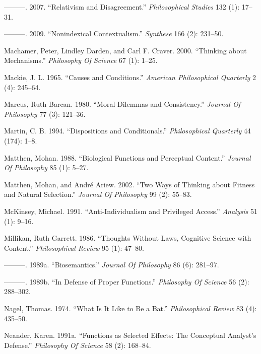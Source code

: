 \documentclass[
  10pt,
  letterpaper,
  DIV=11,
  numbers=noendperiod,
  twoside]{scrartcl}
\newlength{\cslhangindent}
\newenvironment{CSLReferences}[2] %
 {\begin{list}{}{%
  \setlength{\itemindent}{0pt}
  \setlength{\leftmargin}{0pt}
  \setlength{\parsep}{0pt}
  \ifodd #1
   \setlength{\leftmargin}{\cslhangindent}
   \setlength{\itemindent}{-1\cslhangindent}
  \fi
  \setlength{\itemsep}{#2\baselineskip}}}
 {\end{list}}
\begin{document}
\begin{CSLReferences}{1}{0}
---------. 2007. {``Relativism and Disagreement.''} \emph{Philosophical
Studies} 132 (1): 17--31.

---------. 2009. {``Nonindexical Contextualism.''} \emph{Synthese} 166
(2): 231--50.

Machamer, Peter, Lindley Darden, and Carl F. Craver. 2000. {``Thinking
about Mechanisms.''} \emph{Philosophy Of Science} 67 (1): 1--25.

Mackie, J. L. 1965. {``Causes and Conditions.''} \emph{American
Philosophical Quarterly} 2 (4): 245--64.

Marcus, Ruth Barcan. 1980. {``Moral Dilemmas and Consistency.''}
\emph{Journal Of Philosophy} 77 (3): 121--36.

Martin, C. B. 1994. {``Dispositions and Conditionals.''}
\emph{Philosophical Quarterly} 44 (174): 1--8.

Matthen, Mohan. 1988. {``Biological Functions and Perceptual Content.''}
\emph{Journal Of Philosophy} 85 (1): 5--27.

Matthen, Mohan, and André Ariew. 2002. {``Two Ways of Thinking about
Fitness and Natural Selection.''} \emph{Journal Of Philosophy} 99 (2):
55--83.

McKinsey, Michael. 1991. {``Anti-Individualism and Privileged Access.''}
\emph{Analysis} 51 (1): 9--16.

Millikan, Ruth Garrett. 1986. {``Thoughts Without Laws, Cognitive
Science with Content.''} \emph{Philosophical Review} 95 (1): 47--80.

---------. 1989a. {``Biosemantics.''} \emph{Journal Of Philosophy} 86
(6): 281--97.

---------. 1989b. {``In Defense of Proper Functions.''} \emph{Philosophy
Of Science} 56 (2): 288--302.

Nagel, Thomas. 1974. {``What Is It Like to Be a Bat.''}
\emph{Philosophical Review} 83 (4): 435--50.

Neander, Karen. 1991a. {``Functions as Selected Effects: The Conceptual
Analyst's Defense.''} \emph{Philosophy Of Science} 58 (2): 168--84.


\end{CSLReferences}
\end{document}
